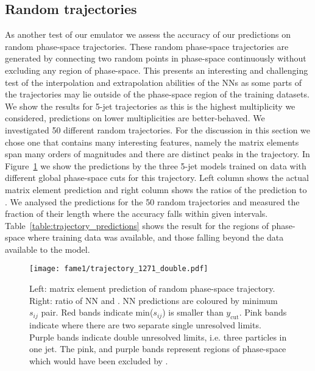 \documentclass[main.tex]{subfiles}
\begin{document}
\subsection{Random trajectories}\label{sec:trajectories}
As another test of our emulator we assess the accuracy of our predictions on random phase-space trajectories.
These random phase-space trajectories are generated by connecting two random points in phase-space continuously without excluding any region of phase-space.
This presents an interesting and challenging test of the interpolation and extrapolation abilities of the NNs as some parts of the trajectories may lie outside of the phase-space region of the training datasets.
We show the results for 5-jet trajectories as this is the highest multiplicity we considered, predictions on lower multiplicities are better-behaved.
We investigated 50 different random trajectories. For the discussion in this section
we chose one that contains many interesting features,
namely the matrix elements span many orders of magnitudes and there are distinct peaks in the trajectory.
In Figure~\ref{fig:random_trajectory} we show the predictions by the three 5-jet models trained on data with different global phase-space cuts for this trajectory.
Left column shows the actual matrix element prediction and right column shows the ratios of the prediction to {\NJet}.
We analysed the predictions for the 50 random trajectories and measured the fraction of their length where the accuracy falls within given intervals.
Table~\ref{table:trajectory_predictions} shows the result for the regions of phase-space where training data was available, and those falling beyond the data available to the model. 

\begin{figure}
    \centering
    \texttt{[image: fame1/trajectory\_1271\_double.pdf]}
    \caption{Left: matrix element prediction of random phase-space trajectory.
    Right: ratio of NN and {\NJet}.
    NN predictions are coloured by minimum $s_{ij}$ pair.
    Red bands indicate min($s_{ij}$) is smaller than $y_{\mathrm{cut}}$.
    Pink bands indicate where there are two separate single unresolved limits.
    Purple bands indicate double unresolved limits, i.e. three particles in one jet.
    The pink, and purple bands represent regions of phase-space which would have been excluded by {\FastJet}.}
    \label{fig:random_trajectory}
\end{figure}
\end{document}
